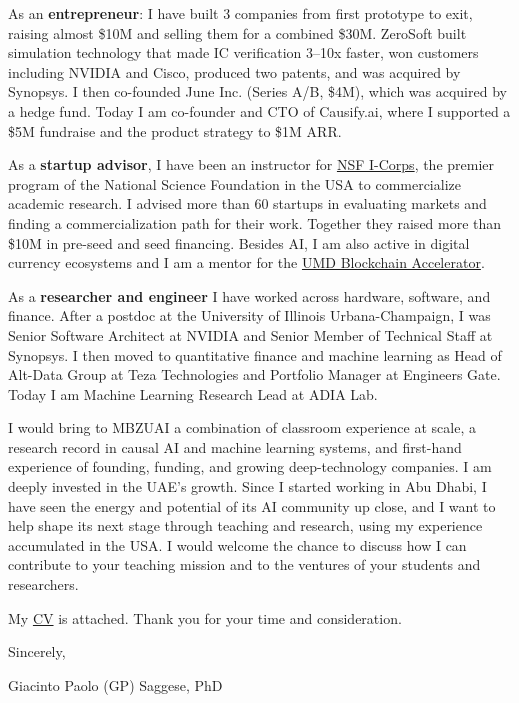 \documentclass[10pt, letterpaper]{article}
\begin{document}
  As an \textbf{entrepreneur}: I have built 3 companies from first prototype to
  exit, raising almost \$10M and selling them for a combined \$30M. ZeroSoft
  built simulation technology that made IC verification 3--10x faster, won
  customers including NVIDIA and Cisco, produced two patents, and was acquired
  by Synopsys. I then co-founded June Inc. (Series A/B, \$4M), which was
  acquired by a hedge fund. Today I am co-founder and CTO of Causify.ai, where I
  supported a \$5M fundraise and the product strategy to \$1M ARR.

  As a \textbf{startup advisor}, I have been an instructor for
  \href{https://www.nsf.gov/funding/initiatives/i-corps}{NSF I-Corps}, the
  premier program of the National Science Foundation in the USA to commercialize
  academic research. I advised more than 60 startups in evaluating markets and
  finding a commercialization path for their work. Together they raised more
  than \$10M in pre-seed and seed financing. Besides AI, I am also active in
  digital currency ecosystems and I am a mentor for the
  \href{https://www.rhsmith.umd.edu/centers-initiatives/supply-chain-management-center/initiatives-programs/blockchain-accelerator}{UMD
  Blockchain Accelerator}.

  As a \textbf{researcher and engineer} I have worked across hardware,
  software, and finance. After a postdoc at the University of Illinois
  Urbana-Champaign, I was Senior Software Architect at NVIDIA and Senior Member
  of Technical Staff at Synopsys. I then moved to quantitative finance and
  machine learning as Head of Alt-Data Group at Teza Technologies and Portfolio
  Manager at Engineers Gate. Today I am Machine Learning Research Lead at ADIA
  Lab.

  I would bring to MBZUAI a combination of classroom experience at scale, a
  research record in causal AI and machine learning systems, and first-hand
  experience of founding, funding, and growing deep-technology companies. I am
  deeply invested in the UAE's growth. Since I started working in Abu Dhabi, I
  have seen the energy and potential of its AI community up close, and I want to
  help shape its next stage through teaching and research, using my experience
  accumulated in the USA. I would welcome the chance to discuss how I can
  contribute to your teaching mission and to the ventures of your students and
  researchers.

  My \href{https://gpsaggese.github.io/02_cv/}{CV} is attached. Thank you for
  your time and consideration.

  Sincerely,

  Giacinto Paolo (GP) Saggese, PhD
\end{document}
